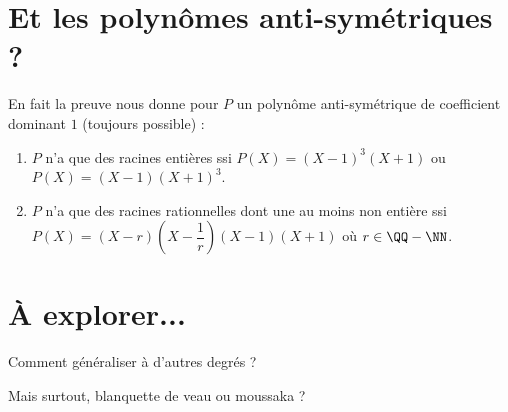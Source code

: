 \documentclass[12pt]{amsart}
\begin{document}
\section{Et les polynômes anti-symétriques ?}

En fait la preuve nous donne pour $P$ un polynôme anti-symétrique de coefficient dominant $1$ (toujours possible) :

\begin{enumerate}
	\item $P$ n'a que des racines entières ssi $P(X) = (X - 1)^3 (X + 1)$ ou $P(X) = (X - 1) (X + 1)^3$.

	\item $P$ n'a que des racines rationnelles dont une au moins non entière ssi $P(X) = (X - r) \left( X - \dfrac1r \right) (X - 1) (X + 1)$ où $r \in \QQ - \NN$.
\end{enumerate}




\section{À explorer...}

Comment généraliser à d'autres degrés ?

\medskip

Mais surtout, blanquette de veau ou moussaka ?
\end{document}
